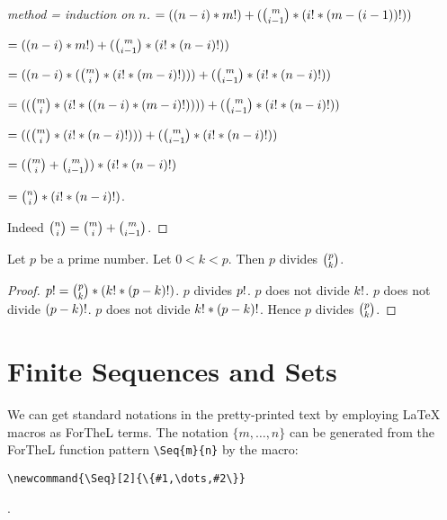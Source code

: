 \documentclass[11pt]{article}
\newcommand{\Seq}[2]{\{#1,\dots,#2\}}
\begin{document}
\begin{forthel}
\begin{proof}[method = induction on $n$]
$=  ((n-i) * m !) + ({m \choose i-1} * (i ! * (m - (i-1)) !))$

$=  ((n-i) * m !) + ({m \choose i-1} * (i ! * (n-i) !))$

$= ((n-i) * ({m \choose i} * (i ! * (m-i) !))) + ({m \choose i-1} * (i ! * (n-i) !))$

$= (({m \choose i} * (i ! * ((n-i) * (m-i) !)))) + ({m \choose i-1} * (i ! * (n-i) !))$

$= (({m \choose i} * (i ! * (n-i) !))) + ({m \choose i-1} * (i ! * (n-i) !))$

$= ({m \choose i} + {m \choose i-1}) * (i ! * (n-i) !) $

$=  {n \choose i} * (i ! * (n-i) !)$.

Indeed ${n \choose i} = {m \choose i} + {m \choose i-1}$.

\end{proof}


\begin{lemma}
Let $p$ be a prime number.
Let $0 < k < p$. Then
$p$ divides ${p \choose k}$.
\end{lemma}
\begin{proof}
$p ! = {p \choose k} * (k ! * (p-k) !)$.
$p$ divides $p !$.
$p$ does not divide $k !$.
$p$ does not divide $(p-k) !$.
$p$ does not divide $k ! * (p-k) !$.
Hence 
$p$ divides ${p \choose k}$.
\end{proof}

\end{forthel}


\section{Finite Sequences and Sets}

We can get standard notations in the pretty-printed
text by employing \LaTeX{} macros as ForTheL terms.
The notation $\Seq{m}{n}$ can be generated 
from the ForTheL function pattern
\verb+\Seq{m}{n}+ 
by the 
macro:
\begin{verbatim}
\newcommand{\Seq}[2]{\{#1,\dots,#2\}}
\end{verbatim}.
\end{document}
